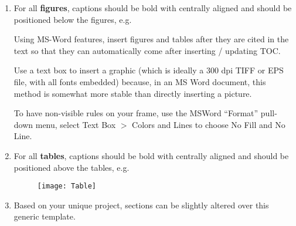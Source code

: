 \begin{enumerate}[label=\roman*.]
\item	For all \textbf{ figures}, captions should be bold with centrally aligned and should be positioned below the figures, e.g.

Using MS-Word features, insert figures and tables after they are cited in the text so that they can automatically come after inserting / updating TOC.	 

Use a text box to insert a graphic (which is ideally a 300 dpi TIFF or EPS file, with all fonts embedded) because, in an MS Word document, this method is somewhat more stable than directly inserting a picture.

To have non-visible rules on your frame, use the MSWord “Format” pull-down menu, select Text Box $>$ Colors and Lines to choose No Fill and No Line.

\item For all \textbf{tables}, captions should be bold with centrally aligned and should be positioned above the tables, e.g.
\begin{figure}[h]  %
    \centering      %
    \texttt{[image: Table]} %
    \label{fig:example}  %
\end{figure}


\item	Based on your unique project, sections can be slightly altered over this generic template.

\end{enumerate}

